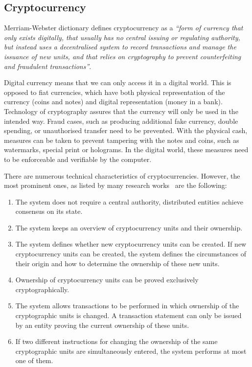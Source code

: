 \subsection{Cryptocurrency}
% 
Merriam-Webster dictionary defines cryptocurrency as a \textit{``form of currency that only exists digitally, that usually has no central issuing or regulating authority, but instead uses a decentralised system to record transactions and manage the issuance of new units, and that relies on cryptography to prevent counterfeiting and fraudulent transactions''}\footnotemark.
% 

Digital currency means that we can only access it in a digital world. This is opposed to fiat currencies, which have both physical representation of the currency (coins and notes) and digital representation (money in a bank). Technology of cryptography assures that the currency will only be used in the intended way. Fraud cases, such as producing additional fake currency, double spending, or unauthorised transfer need to be prevented. With the physical cash, measures can be taken to prevent tampering with the notes and coins, such as watermarks, special print or holograms. In the digital world, these measures need to be enforceable and verifiable by the computer.

There are numerous technical characteristics of cryptocurrencies. However, the most prominent ones, as listed by many research works~\cite{Lansky2018PossibleCryptocurrencies} are the following:
\begin{enumerate}[noitemsep]
    \item The system does not require a central authority, distributed entities achieve consensus on its state.
    \item The system keeps an overview of cryptocurrency units and their ownership.
    \item The system defines whether new cryptocurrency units can be created. If new cryptocurrency units can  be  created,  the  system  defines  the  circumstances  of  their  origin  and  how  to  determine  the ownership of these new units.
    \item Ownership of cryptocurrency units can be proved exclusively cryptographically.
    \item The system allows transactions to be performed in  which ownership of the cryptographic units is changed. A transaction statement can only be issued by an entity proving the current ownership of these units.
    \item If  two  different  instructions  for  changing  the  ownership  of the  same  cryptographic  units  are simultaneously entered, the system performs at most one of them.
\end{enumerate}

